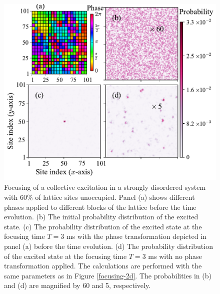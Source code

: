 \begin{figure}[htbp]
\centering
\includegraphics[width=\linewidth]{t-matrix-focusing.pdf}
\caption{  Focusing of a collective excitation in a strongly disordered system with 60\% of lattice sites unoccupied.  Panel (a) shows different phases applied to
different blocks of the lattice before the time evolution.
(b) The initial probability distribution of the excited state. (c) The probability distribution of the excited state at the
focusing time $T = 3$ ms with the phase transformation depicted in panel (a) before the time
evolution. (d) The probability distribution of the excited state at the focusing time $T = 3$ ms with no phase transformation
applied. The calculations are performed
with the same parameters as in Figure \ref{focusing-2d}. The
probabilities in (b) and (d) are magnified by 60 and 5,
respectively. } \label{t-matrix-focusing}
\end{figure}


